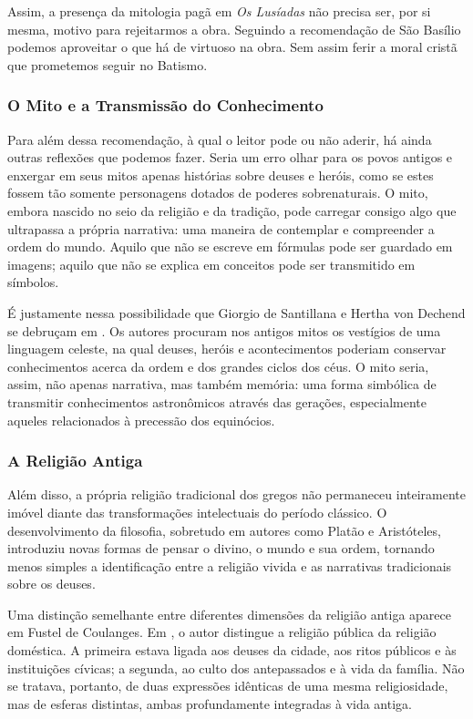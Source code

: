 Assim, a presença da mitologia pagã em \textit{Os Lusíadas} não precisa ser,
por si mesma, motivo para rejeitarmos a obra. Seguindo a recomendação de São
Basílio podemos aproveitar o que há de virtuoso na obra. Sem assim ferir a
moral cristã que prometemos seguir no Batismo.

\subsubsection{O Mito e a Transmissão do Conhecimento}

Para além dessa recomendação, à qual o leitor pode ou não aderir, há ainda
outras reflexões que podemos fazer. Seria um erro olhar para os povos antigos
e enxergar em seus mitos apenas histórias sobre deuses e heróis, como se estes
fossem tão somente personagens dotados de poderes sobrenaturais. O mito, embora
nascido no seio da religião e da tradição, pode carregar consigo algo que
ultrapassa a própria narrativa: uma maneira de contemplar e compreender a
ordem do mundo. Aquilo que não se escreve em fórmulas pode ser guardado em
imagens; aquilo que não se explica em conceitos pode ser transmitido em
símbolos.

É justamente nessa possibilidade que Giorgio de Santillana e Hertha von Dechend
se debruçam em 
\cite{santillana_dechend_hamlets_mill}. Os autores procuram nos antigos mitos
os vestígios de uma linguagem celeste, na qual deuses, heróis e acontecimentos
poderiam conservar conhecimentos acerca da ordem e dos grandes ciclos dos céus.
O mito seria, assim, não apenas narrativa, mas também memória: uma forma
simbólica de transmitir conhecimentos astronômicos através das gerações,
especialmente aqueles relacionados à precessão dos equinócios.

\subsubsection{A Religião Antiga}

Além disso, a própria religião tradicional dos gregos não permaneceu
inteiramente imóvel diante das transformações intelectuais do período clássico.
O desenvolvimento da filosofia, sobretudo em autores como Platão e Aristóteles,
introduziu novas formas de pensar o divino, o mundo e sua ordem, tornando menos
simples a identificação entre a religião vivida e as narrativas tradicionais
sobre os deuses.

Uma distinção semelhante entre diferentes dimensões da religião antiga aparece
em Fustel de Coulanges. Em 
\cite{fustel_cidade_antiga}, o autor distingue a religião pública da religião
doméstica. A primeira estava ligada aos deuses da cidade, aos ritos públicos e
às instituições cívicas; a segunda, ao culto dos antepassados e à vida da
família. Não se tratava, portanto, de duas expressões idênticas de uma mesma
religiosidade, mas de esferas distintas, ambas profundamente integradas à vida
antiga.

